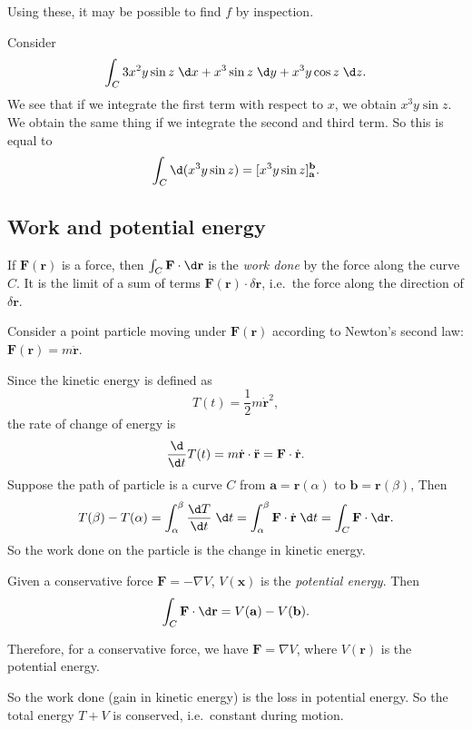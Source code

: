 \documentclass[a4paper]{article}
\begin{document}
Using these, it may be possible to find $f$ by inspection.

\begin{eg}
  Consider
  \[
    \int_C 3x^2 y\sin z\;\d x + x^3 \sin z \;\d y + x^3 y\cos z\;\d z.
  \]
  We see that if we integrate the first term with respect to $x$, we obtain $x^3 y\sin z$. We obtain the same thing if we integrate the second and third term. So this is equal to
  \[
    \int_C \d (x^3 y \sin z) = [x^3 y\sin z]^{\mathbf{b}}_{\mathbf{a}}.
  \]
\end{eg}

\subsection{Work and potential energy}
\begin{defi}
  If $\mathbf{F}(\mathbf{r})$ is a force, then $\int_C \mathbf{F}\cdot \d \mathbf{r}$ is the \emph{work done} by the force along the curve $C$. It is the limit of a sum of terms $\mathbf{F}(\mathbf{r})\cdot \delta \mathbf{r}$, i.e.\ the force along the direction of $\delta \mathbf{r}$.
\end{defi}

Consider a point particle moving under $\mathbf{F}(\mathbf{r})$ according to Newton's second law: $\mathbf{F}(\mathbf{r}) = m\ddot{\mathbf{r}}$.

Since the kinetic energy is defined as
\[
  T(t) = \frac{1}{2}m\dot{\mathbf{r}}^2,
\]
the rate of change of energy is
\[
  \frac{\d}{\d t}T(t) = m\dot{\mathbf{r}}\cdot \ddot{\mathbf{r}} = \mathbf{F}\cdot \dot{\mathbf{r}}.
\]
Suppose the path of particle is a curve $C$ from $\mathbf{a} = \mathbf{r}(\alpha)$ to $\mathbf{b} = \mathbf{r}(\beta)$, Then
\[
  T(\beta) - T(\alpha) = \int_\alpha^\beta \frac{\d T}{\d t} \;\d t = \int_\alpha^\beta \mathbf{F}\cdot \dot{\mathbf{r}}\;\d t = \int_C \mathbf{F}\cdot \d \mathbf{r}.
\]
So the work done on the particle is the change in kinetic energy.

\begin{defi}
  Given a conservative force $\mathbf{F} = -\nabla V$, $V(\mathbf{x})$ is the \emph{potential energy}. Then
  \[
    \int_C \mathbf{F}\cdot \d \mathbf{r} = V(\mathbf{a}) - V(\mathbf{b}).
  \]
\end{defi}
Therefore, for a conservative force, we have $\mathbf{F} = \nabla V$, where $V(\mathbf{r})$ is the potential energy.

So the work done (gain in kinetic energy) is the loss in potential energy. So the total energy $T + V$ is conserved, i.e.\ constant during motion.
\end{document}
